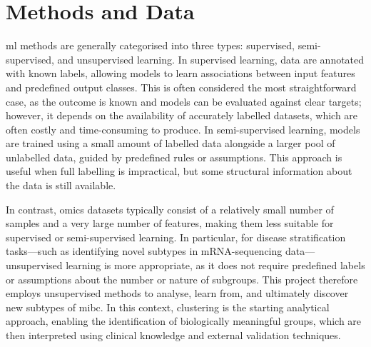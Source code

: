 \section{Methods and Data} \label{s:lit:computational}

\vspace{3mm}
\vspace{3mm}

\acrfull{ml} methods are generally categorised into three types: supervised, semi-supervised, and unsupervised learning. In supervised learning, data are annotated with known labels, allowing models to learn associations between input features and predefined output classes. This is often considered the most straightforward case, as the outcome is known and models can be evaluated against clear targets; however, it depends on the availability of accurately labelled datasets, which are often costly and time-consuming to produce. In semi-supervised learning, models are trained using a small amount of labelled data alongside a larger pool of unlabelled data, guided by predefined rules or assumptions. This approach is useful when full labelling is impractical, but some structural information about the data is still available.

In contrast, omics datasets typically consist of a relatively small number of samples and a very large number of features, making them less suitable for supervised or semi-supervised learning. In particular, for disease stratification tasks—such as identifying novel subtypes in mRNA-sequencing data—unsupervised learning is more appropriate, as it does not require predefined labels or assumptions about the number or nature of subgroups. This project therefore employs unsupervised methods to analyse, learn from, and ultimately discover new subtypes of \acrlong{mibc}. In this context, clustering is the starting analytical approach, enabling the identification of biologically meaningful groups, which are then interpreted using clinical knowledge and external validation techniques.

